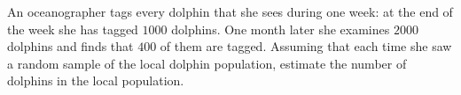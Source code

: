 An oceanographer tags every dolphin that she sees during one week: at the end of the week she has tagged $1000$ dolphins. One month later she examines $2000$ dolphins and finds that $400$ of them are tagged. Assuming that each time she saw a random sample of the local dolphin population, estimate the number of dolphins in the local population.

